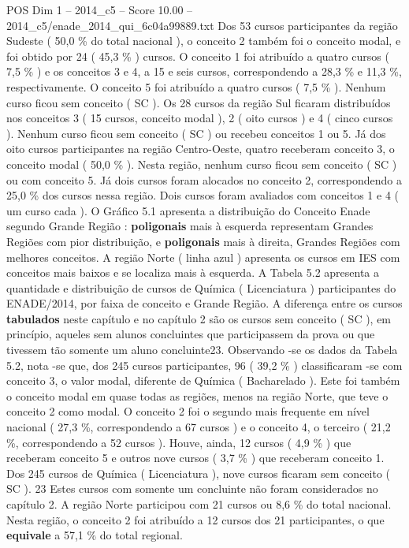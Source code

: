 \begin{textsample}{POS Dim 1 – 2014\_c5 – Score 10.00 – 2014\_c5/enade\_2014\_qui\_6c04a99889.txt}
Dos 53 cursos participantes da região Sudeste ( 50,0 \% do total nacional ), o conceito 2 também foi o conceito modal, e foi obtido por 24 ( 45,3 \% ) cursos.
O conceito 1 foi atribuído a quatro cursos ( 7,5 \% ) e os conceitos 3 e 4, a 15 e seis cursos, correspondendo a 28,3 \% e 11,3 \%, respectivamente.
O conceito 5 foi atribuído a quatro cursos ( 7,5 \% ).
Nenhum curso ficou sem conceito ( SC ).
Os 28 cursos da região Sul ficaram distribuídos nos conceitos 3 ( 15 cursos, conceito modal ), 2 ( oito cursos ) e 4 ( cinco cursos ).
Nenhum curso ficou sem conceito ( SC ) ou recebeu conceitos 1 ou 5.
Já dos oito cursos participantes na região Centro-Oeste, quatro receberam conceito 3, o conceito modal ( 50,0 \% ).
Nesta região, nenhum curso ficou sem conceito ( SC ) ou com conceito 5.
Já dois cursos foram alocados no conceito 2, correspondendo a 25,0 \% dos cursos nessa região.
Dois cursos foram avaliados com conceitos 1 e 4 ( um curso cada ).
O Gráfico 5.1 apresenta a distribuição do Conceito Enade segundo Grande Região : \textbf{poligonais} mais à esquerda representam Grandes Regiões com pior distribuição, e \textbf{poligonais} mais à direita, Grandes Regiões com melhores conceitos.
A região Norte ( linha azul ) apresenta os cursos em IES com conceitos mais baixos e se localiza mais à esquerda.
A Tabela 5.2 apresenta a quantidade e distribuição de cursos de Química ( Licenciatura ) participantes do ENADE/2014, por faixa de conceito e Grande Região.
A diferença entre os cursos \textbf{tabulados} neste capítulo e no capítulo 2 são os cursos sem conceito ( SC ), em princípio, aqueles sem alunos concluintes que participassem da prova ou que tivessem tão somente um aluno concluinte23.
Observando -se os dados da Tabela 5.2, nota -se que, dos 245 cursos participantes, 96 ( 39,2 \% ) classificaram -se com conceito 3, o valor modal, diferente de Química ( Bacharelado ).
Este foi também o conceito modal em quase todas as regiões, menos na região Norte, que teve o conceito 2 como modal.
O conceito 2 foi o segundo mais frequente em nível nacional ( 27,3 \%, correspondendo a 67 cursos ) e o conceito 4, o terceiro ( 21,2 \%, correspondendo a 52 cursos ).
Houve, ainda, 12 cursos ( 4,9 \% ) que receberam conceito 5 e outros nove cursos ( 3,7 \% ) que receberam conceito 1.
Dos 245 cursos de Química ( Licenciatura ), nove cursos ficaram sem conceito ( SC ). 23 Estes cursos com somente um concluinte não foram considerados no capítulo 2.
A região Norte participou com 21 cursos ou 8,6 \% do total nacional.
Nesta região, o conceito 2 foi atribuído a 12 cursos dos 21 participantes, o que \textbf{equivale} a 57,1 \% do total regional.

\end{textsample}
